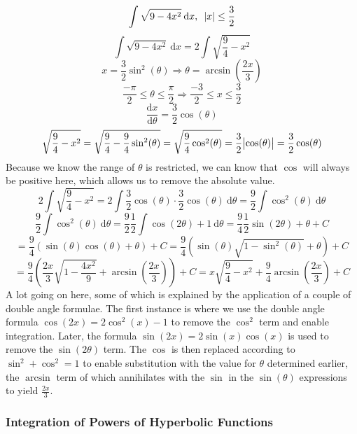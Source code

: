 \documentclass[12pt]{report}
\newcommand{\dx}{\:\mathrm{d}x}
\newcommand{\dd}[2]{\frac{\mathrm{d}#1}{\mathrm{d}#2}}
\newcommand{\mcom}{, \:\:\:}
\begin{document}
\begin{flushleft}
\begin{center}
\[\int\sqrt{9 - 4x^2}\dx\mcom \abs{x} \leq \frac{3}{2}\]
\[\int\sqrt{9 - 4x^2}\dx = 2\int\sqrt{\frac{9}{4} - x^2}\]
\[x = \frac{3}{2}\sin^2(\theta) \Rightarrow \theta = 
\arcsin\left(\frac{2x}{3}\right)\] 
\[\frac{-\pi}{2} \leq \theta \leq \frac{\pi}{2} \Rightarrow \frac{-3}{2} \leq
x \leq \frac{3}{2}\]
\[\dd{x}{\theta} = \frac{3}{2}\cos(\theta)\]
\[\sqrt{\frac{9}{4} - x^2} = \sqrt{\frac{9}{4} - \frac{9}{4}\sin^2(\theta)} =
\sqrt{\frac{9}{4}\cos^2(\theta)} = \frac{3}{2}\abs{\cos(\theta)} 
= \frac{3}{2}\cos(\theta)\]
Because we know the range of \(\theta\) is restricted, we can know that
\(\cos\) will always be positive here, which allows us to remove the absolute
value.
\[2\int\sqrt{\frac{9}{4} - x^2} = 2\int\frac{3}{2}\cos(\theta)\cdot\frac{3}{2}
\cos(\theta)\:\mathrm{d}\theta 
= \frac{9}{2}\int\cos^2(\theta)\:\mathrm{d}\theta\]
\[\frac{9}{2}\int\cos^2(\theta)\:\mathrm{d}\theta = \frac{9}{2}\frac{1}{2}
\int\cos(2\theta) + 1\:\mathrm{d}\theta = \frac{9}{4}\frac{1}{2}\sin(2\theta)
+ \theta + C\]
\[= \frac{9}{4}\left(\sin(\theta)\cos(\theta) + \theta\right) + C = \frac{9}{4}
\left(\sin(\theta)\sqrt{1 - \sin^2(\theta)} + \theta\right) + C\]
\[= \frac{9}{4}\left(\frac{2x}{3}\sqrt{1 - \frac{4x^2}{9}} + 
\arcsin\left(\frac{2x}{3}\right)\right) + C = x\sqrt{\frac{9}{4} - x^2} 
+ \frac{9}{4}\arcsin\left(\frac{2x}{3}\right) + C\]
A lot going on here, some of which is explained by the application of a couple
of double angle formulae. The first instance is where we use the double angle
formula \(\cos(2x) = 2\cos^2(x) - 1\) to remove the \(\cos^2\) term and enable
integration. Later, the formula \(\sin(2x) = 2\sin(x)\cos(x)\) is used to
remove the \(\sin(2\theta)\) term. The \(\cos\) is then replaced according to
\(\sin^2 + \cos^2 = 1\) to enable substitution with the value for \(\theta\)
determined earlier, the \(\arcsin\) term of which annihilates with the 
\(\sin\) in the \(\sin(\theta)\) expressions to yield \(\frac{2x}{3}\).
\end{center}

\subsubsection*{Integration of Powers of Hyperbolic Functions}


\end{flushleft}
\end{document}
